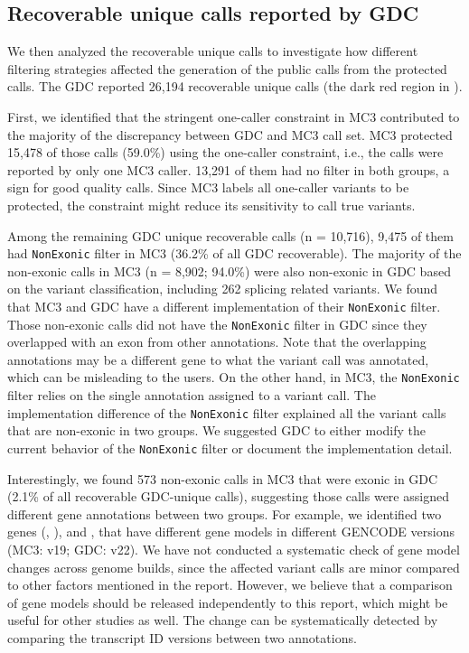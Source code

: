 \subsection{Recoverable unique calls reported by GDC}
We then analyzed the recoverable unique calls to investigate how different filtering strategies affected the generation of the public calls from the protected calls. The GDC reported 26,194 recoverable unique calls (the dark red region in ).

First, we identified that the stringent one-caller constraint in MC3 contributed to the majority of the discrepancy between GDC and MC3 call set. MC3 protected 15,478 of those calls (59.0\%) using the one-caller constraint, i.e., the calls were reported by only one MC3 caller. 13,291 of them had no filter in both groups, a sign for good quality calls. Since MC3 labels all one-caller variants to be protected, the constraint might reduce its sensitivity to call true variants.

Among the remaining GDC unique recoverable calls (n = 10,716), 9,475 of them had \texttt{NonExonic} filter in MC3 (36.2\% of all GDC recoverable). The majority of the non-exonic calls in MC3 (n = 8,902; 94.0\%) were also non-exonic in GDC based on the variant classification, including 262 splicing related variants. We found that MC3 and GDC have a different implementation of their \texttt{NonExonic} filter. Those non-exonic calls did not have the \texttt{NonExonic} filter in GDC since they overlapped with an exon from other annotations. Note that the overlapping annotations may be a different gene to what the variant call was annotated, which can be misleading to the users. On the other hand, in MC3, the \texttt{NonExonic} filter relies on the single annotation assigned to a variant call. The implementation difference of the \texttt{NonExonic} filter explained all the variant calls that are non-exonic in two groups. We suggested GDC to either modify the current behavior of the \texttt{NonExonic} filter or document the implementation detail.

Interestingly, we found 573 non-exonic calls in MC3 that were exonic in GDC (2.1\% of all recoverable GDC-unique calls), suggesting those calls were assigned different gene annotations between two groups. For example, we identified two genes (, ),  and , that have different gene models in different GENCODE versions (MC3: v19; GDC: v22). We have not conducted a systematic check of gene model changes across genome builds, since the affected variant calls are minor compared to other factors mentioned in the report. However, we believe that a comparison of gene models should be released independently to this report, which might be useful for other studies as well. The change can be systematically detected by comparing the transcript ID versions between two annotations.


